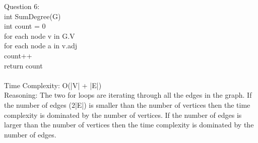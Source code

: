 \documentclass[12pt]{article}
\newcommand\tab[1][1cm]{\hspace*{#1}}
\begin{document}
Question 6:\\
\tab\tab int SumDegree(G)\\
\tab\tab\tab int count = 0\\
\tab\tab\tab for each node v in G.V\\
\tab\tab\tab\tab for each node a in v.adj\\
\tab\tab\tab\tab\tab count++\\
\tab\tab\tab return count\\\\
\tab Time Complexity: O(|V| + |E|)\\
\tab Reasoning: The two for loops are iterating through all the edges in the graph. If the number of edges ($2$|E|) is smaller than the number of vertices then the time complexity is dominated by the number of vertices. If the number of edges is larger than the number of vertices then the time complexity is dominated by the number of edges.\\\\
\end{document}
